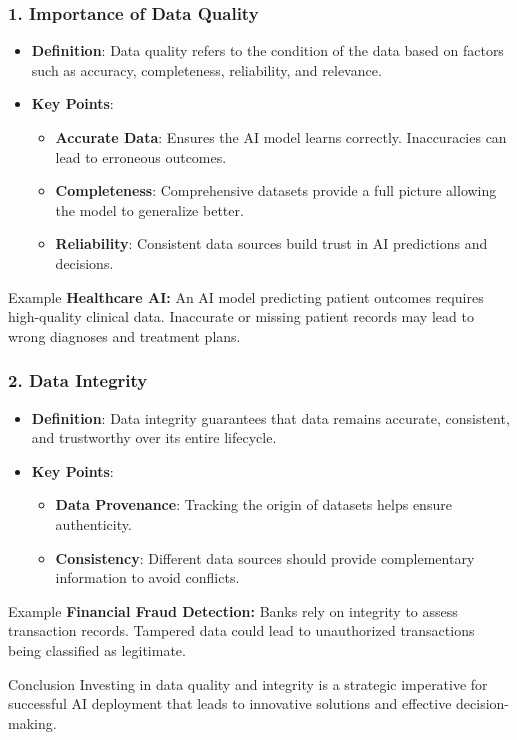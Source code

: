 \documentclass[aspectratio=169]{beamer}
\begin{document}
\begin{frame}[fragile]
  \frametitle{1. Importance of Data Quality}
  \begin{itemize}
    \item \textbf{Definition}: Data quality refers to the condition of the data based on factors such as accuracy, completeness, reliability, and relevance.
    
    \item \textbf{Key Points}:
      \begin{itemize}
        \item \textbf{Accurate Data}: Ensures the AI model learns correctly. Inaccuracies can lead to erroneous outcomes.
        \item \textbf{Completeness}: Comprehensive datasets provide a full picture allowing the model to generalize better.
        \item \textbf{Reliability}: Consistent data sources build trust in AI predictions and decisions.
      \end{itemize}
  \end{itemize}
  
  \begin{block}{Example}
    \textbf{Healthcare AI:} An AI model predicting patient outcomes requires high-quality clinical data. Inaccurate or missing patient records may lead to wrong diagnoses and treatment plans.
  \end{block}
\end{frame}

\begin{frame}[fragile]
  \frametitle{2. Data Integrity}
  \begin{itemize}
    \item \textbf{Definition}: Data integrity guarantees that data remains accurate, consistent, and trustworthy over its entire lifecycle.
    
    \item \textbf{Key Points}:
      \begin{itemize}
        \item \textbf{Data Provenance}: Tracking the origin of datasets helps ensure authenticity.
        \item \textbf{Consistency}: Different data sources should provide complementary information to avoid conflicts.
      \end{itemize}
  \end{itemize}
  
  \begin{block}{Example}
    \textbf{Financial Fraud Detection:} Banks rely on integrity to assess transaction records. Tampered data could lead to unauthorized transactions being classified as legitimate.
  \end{block}
  
  \begin{block}{Conclusion}
    Investing in data quality and integrity is a strategic imperative for successful AI deployment that leads to innovative solutions and effective decision-making.
  \end{block}
\end{frame}
\end{document}
